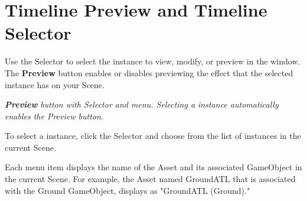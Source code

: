 \chapter{Timeline Preview and Timeline Selector}
\hypertarget{md__library_2_package_cache_2com_8unity_8timeline_0d1_87_86_2_documentation_0i_2tl__selector}{}\label{md__library_2_package_cache_2com_8unity_8timeline_0d1_87_86_2_documentation_0i_2tl__selector}
\label{md__library_2_package_cache_2com_8unity_8timeline_0d1_87_86_2_documentation_0i_2tl__selector_autotoc_md1246}%
%
 Use the  Selector to select the  instance to view, modify, or preview in the  window. The  {\bfseries{Preview}} button enables or disables previewing the effect that the selected  instance has on your Scene.



{\itshape {} {\bfseries{Preview}} button with  Selector and menu. Selecting a  instance automatically enables the  Preview button.}

To select a  instance, click the  Selector and choose from the list of  instances in the current Scene.

Each menu item displays the name of the  Asset and its associated Game\+Object in the current Scene. For example, the  Asset named Ground\+ATL that is associated with the Ground Game\+Object, displays as "{}\+Ground\+ATL (\+Ground)."{} 